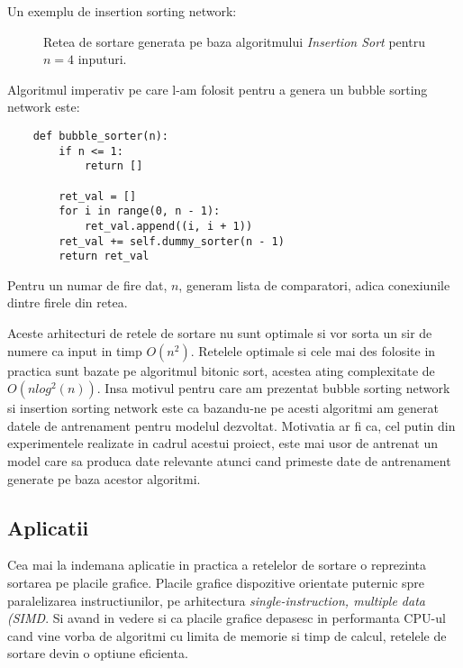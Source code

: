 \documentclass[12pt]{article}
\begin{document}
Un exemplu de insertion sorting network:

\begin{figure}
\centering
{}
\caption{Retea de sortare generata pe baza algoritmului \textit{Insertion Sort} pentru $n=4$ inputuri.}
\end{figure}

Algoritmul imperativ pe care l-am folosit pentru a genera un bubble sorting network este:
\begin{lstlisting}
    def bubble_sorter(n):
        if n <= 1:
            return []

        ret_val = []
        for i in range(0, n - 1):
            ret_val.append((i, i + 1))
        ret_val += self.dummy_sorter(n - 1)
        return ret_val
\end{lstlisting}
Pentru un numar de fire dat, $n$, generam lista de comparatori, adica conexiunile dintre firele din retea.

    Aceste arhitecturi de retele de sortare nu sunt optimale si vor sorta un sir de numere ca input in timp
$O(n^2)$. Retelele optimale si cele mai des folosite in practica sunt bazate pe algoritmul bitonic sort, acestea ating complexitate de $O(nlog^2(n))$. Insa motivul pentru care am prezentat bubble sorting network si insertion sorting network este
ca bazandu-ne pe acesti algoritmi am generat datele de antrenament pentru modelul dezvoltat. Motivatia ar fi ca, cel putin din experimentele realizate in cadrul acestui proiect, este mai usor de antrenat un model care sa produca date relevante atunci cand primeste date de antrenament generate pe baza acestor algoritmi.

\subsection{Aplicatii}
Cea mai la indemana aplicatie in practica a retelelor de sortare o reprezinta sortarea pe placile grafice. Placile grafice dispozitive orientate puternic spre paralelizarea instructiunilor, pe arhitectura \textit{single-instruction, multiple data (SIMD}. Si avand in vedere si ca placile grafice depasesc in performanta CPU-ul cand vine vorba de algoritmi cu limita de memorie si timp de calcul, retelele de sortare devin o optiune eficienta.
\end{document}
